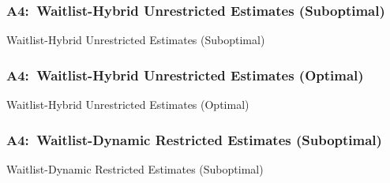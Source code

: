 \documentclass[12pt, aspectratio=169]{beamer}
\begin{document}
\begin{frame}[label=whues]
\frametitle{A4:\ Waitlist-Hybrid Unrestricted Estimates (Suboptimal)}
\begin{table}[htbp]
  \centering
  \renewcommand{\thetable}{\arabic{table}a}
  \caption{Waitlist-Hybrid Unrestricted Estimates (Suboptimal)}
  \vspace{5pt}
  \begin{adjustbox}{totalheight=.7\textheight}

  \end{adjustbox}
\end{table}%
\hyperlink{wdues}{}
\end{frame}

\begin{frame}[label=whueo]
\frametitle{A4:\ Waitlist-Hybrid Unrestricted Estimates (Optimal)}
\addtocounter{framenumber}{-1}
\begin{table}[htbp]
  \centering
  \addtocounter{table}{-1}
  \renewcommand{\thetable}{\arabic{table}b}
  \caption{Waitlist-Hybrid Unrestricted Estimates (Optimal)}
  \vspace{5pt}
  \begin{adjustbox}{totalheight=.7\textheight}

  \end{adjustbox}
\end{table}%
\hyperlink{wdueo}{}
\end{frame}

\begin{frame}[label=wdres]
\frametitle{A4:\ Waitlist-Dynamic Restricted Estimates (Suboptimal)}
\begin{table}[htbp]
  \centering
  \renewcommand{\thetable}{\arabic{table}a}
  \caption{Waitlist-Dynamic Restricted Estimates (Suboptimal)}
  \vspace{5pt}
  \begin{adjustbox}{totalheight=.7\textheight}

  \end{adjustbox}
\end{table}%
\hyperlink{wdues}{}
\end{frame}
\end{document}
